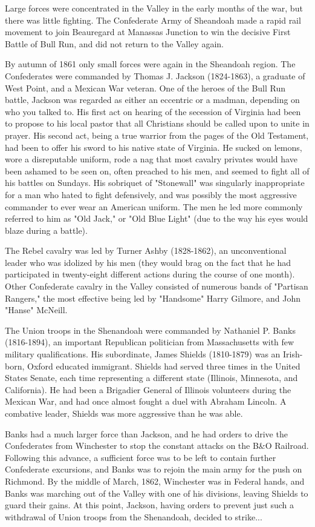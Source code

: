 Large forces were concentrated in the Valley in the early months of the war,
but there was little fighting. The Confederate Army of Sheandoah made a rapid
rail movement to join Beauregard at Manassas Junction to win the decisive First
Battle of Bull Run, and did not return to the Valley again.

By autumn of 1861 only small forces were again in the Sheandoah region. The
Confederates were commanded by Thomas J. Jackson (1824-1863), a graduate of
West Point, and a Mexican War veteran. One of the heroes of the Bull Run
battle, Jackson was regarded as either an eccentric or a madman, depending on
who you talked to. His first act on hearing of the secession of Virginia had
been to propose to his local pastor that all Christians should be called upon
to unite in prayer. His second act, being a true warrior from the pages of the
Old Testament, had been to offer his sword to his native state of Virginia. He
sucked on lemons, wore a disreputable uniform, rode a nag that most cavalry
privates would have been ashamed to be seen on, often preached to his men, and
seemed to fight all of his battles on Sundays. His sobriquet of "Stonewall" was
singularly inappropriate for a man who hated to fight defensively, and was
possibly the most aggressive commander to ever wear an American uniform. The
men he led more commonly referred to him as "Old Jack," or "Old Blue Light"
(due to the way his eyes would blaze during a battle).

The Rebel cavalry was led by Turner Ashby (1828-1862), an unconventional leader
who was idolized by his men (they would brag on the fact that he had
participated in twenty-eight different actions during the course of one month).
Other Confederate cavalry in the Valley consisted of numerous bands of
"Partisan Rangers," the most effective being led by "Handsome" Harry Gilmore,
and John "Hanse" McNeill.

The Union troops in the Shenandoah were commanded by Nathaniel P. Banks
(1816-1894), an important Republican politician from Massachusetts with few
military qualifications. His subordinate, James Shields (1810-1879) was an
Irish-born, Oxford educated immigrant. Shields had served three times in the
United States Senate, each time representing a different state (Illinois,
Minnesota, and California). He had been a Brigadier General of Illinois
volunteers during the Mexican War, and had once almost fought a duel with
Abraham Lincoln. A combative leader, Shields was more aggressive than he was
able.

Banks had a much larger force than Jackson, and he had orders to drive the
Confederates from Winchester to stop the constant attacks on the B\&O Railroad.
Following this advance, a sufficient force was to be left to contain further
Confederate excursions, and Banks was to rejoin the main army for the push on
Richmond. By the middle of March, 1862, Winchester was in Federal hands, and
Banks was marching out of the Valley with one of his divisions, leaving Shields
to guard their gains. At this point, Jackson, having orders to prevent just
such a withdrawal of Union troops from the Shenandoah, decided to strike...
